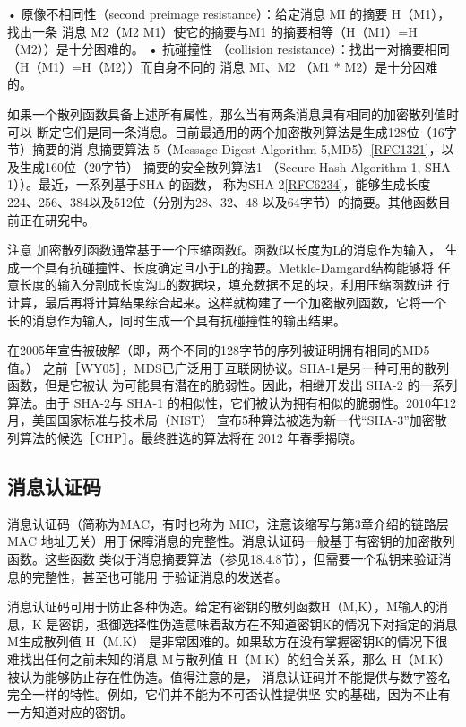 • 原像不相同性（second preimage resistance）：给定消息 MI 的摘要 H（M1），找出一条
消息 M2（M2 M1）使它的摘要与M1 的摘要相等（H（M1）=H（M2））是十分困难的。
• 抗碰撞性 （collision resistance）：找出一对摘要相同 （H（M1）=H（M2））而自身不同的
消息 MI、M2 （M1 * M2）是十分困难的。

如果一个散列函数具备上述所有属性，那么当有两条消息具有相同的加密散列值时可以
断定它们是同一条消息。目前最通用的两个加密散列算法是生成128位（16字节）摘要的消
息摘要算法 5（Message Digest Algorithm 5,MD5）\href{https://www.rfc-editor.org/rfc/rfc1321}{[RFC1321]}，以及生成160位（20字节）
摘要的安全散列算法1 （Secure Hash Algorithm 1, SHA-1））。最近，一系列基于SHA 的函数，
称为SHA-2\href{https://www.rfc-editor.org/rfc/rfc6234}{[RFC6234]}，能够生成长度224、256、384以及512位（分别为28、32、48
以及64字节）的摘要。其他函数目前正在研究中。

注意 加密散列函数通常基于一个压缩函数f。函数f以长度为L的消息作为输入，
生成一个具有抗碰撞性、长度确定且小于L的摘要。Metkle-Damgard结构能够将
任意长度的输入分割成长度沟L的数据块，填充数据不足的块，利用压缩函数f进
行计算，最后再将计算结果综合起来。这样就构建了一个加密散列函数，它将一个
长的消息作为输入，同时生成一个具有抗碰撞性的输出结果。

在2005年宣告被破解（即，两个不同的128字节的序列被证明拥有相同的MD5值。）
之前［WY05］，MDS已广泛用于互联网协议。SHA-1是另一种可用的散列函数，但是它被认
为可能具有潜在的脆弱性。因此，相继开发出 SHA-2 的一系列算法。由于 SHA-2与 SHA-1
的相似性，它们被认为拥有相似的脆弱性。2010年12月，美国国家标准与技术局（NIST）
宣布5种算法被选为新一代“SHA-3”加密散列算法的候选［CHP］。最终胜选的算法将在
2012 年春季揭晓。

\subsection{消息认证码}
消息认证码（简称为MAC，有时也称为 MIC，注意该缩写与第3章介绍的链路层 MAC
地址无关）用于保障消息的完整性。消息认证码一般基于有密钥的加密散列函数。这些函数
类似于消息摘要算法（参见18.4.8节），但需要一个私钥来验证消息的完整性，甚至也可能用
于验证消息的发送者。

消息认证码可用于防止各种伪造。给定有密钥的散列函数H（M,K），M输人的消息，K
是密钥，抵御选择性伪造意味着敌方在不知道密钥K的情况下对指定的消息 M生成散列值
H（M.K） 是非常困难的。如果敌方在没有掌握密钥K的情况下很难找出任何之前未知的消息
M与散列值 H（M.K）的组合关系，那么 H（M.K） 被认为能够防止存在性伪造。值得注意的是，
消息认证码并不能提供与数字签名完全一样的特性。例如，它们并不能为不可否认性提供坚
实的基础，因为不止有一方知道对应的密钥。

